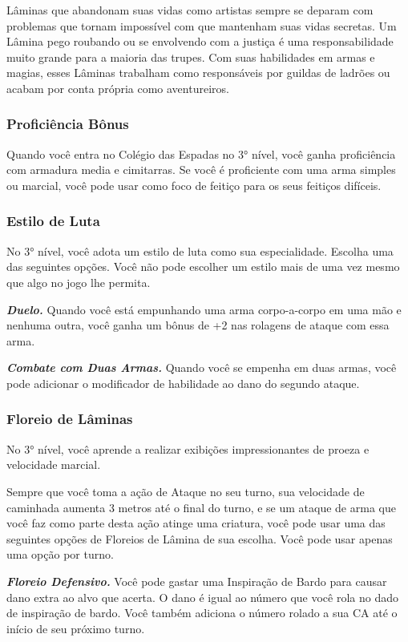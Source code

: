 \begin{multicols}{2}
Lâminas que abandonam suas vidas como artistas sempre se deparam com problemas
que tornam impossível com que mantenham suas vidas secretas. Um Lâmina pego
roubando ou se envolvendo com a justiça é uma responsabilidade muito grande para
a maioria das trupes. Com suas habilidades em armas e magias, esses Lâminas
trabalham como responsáveis por guildas de ladrões ou acabam por conta própria
como aventureiros.

\subsubsection{Proficiência Bônus}%

Quando você entra no Colégio das Espadas no 3° nível, você ganha proficiência
com armadura media e cimitarras.
Se você é proficiente com uma arma simples ou marcial, você pode usar como foco
de feitiço para os seus feitiços difíceis.

\subsubsection{Estilo de Luta}%

No 3° nível, você adota um estilo de luta como sua especialidade. Escolha uma
das seguintes opções. Você não pode escolher um estilo mais de uma vez mesmo que
algo no jogo lhe permita.

\textit{\textbf{Duelo.}} Quando você está empunhando uma arma corpo-a-corpo em
uma mão e nenhuma outra, você ganha um bônus de +2 nas rolagens de ataque com
essa arma.

\textit{\textbf{Combate com Duas Armas.}} Quando você se empenha em duas armas,
você pode adicionar o modificador de habilidade ao dano do segundo ataque.

\subsubsection{Floreio de Lâminas}%

No 3° nível, você aprende a realizar exibições impressionantes de proeza e
velocidade marcial.

Sempre que você toma a ação de Ataque no seu turno, sua velocidade de caminhada
aumenta 3 metros até o final do turno, e se um ataque de arma que você faz como
parte desta ação atinge uma criatura, você pode usar uma das seguintes opções de
Floreios de Lâmina de sua escolha. Você pode usar apenas uma opção por turno.

\textbf{\textit{Floreio Defensivo.}} Você pode gastar uma Inspiração de Bardo
para causar dano extra ao alvo que acerta. O dano é igual ao número que você
rola no dado de inspiração de bardo. Você também adiciona o número rolado a sua
CA até o início de seu próximo turno.


\end{multicols}
